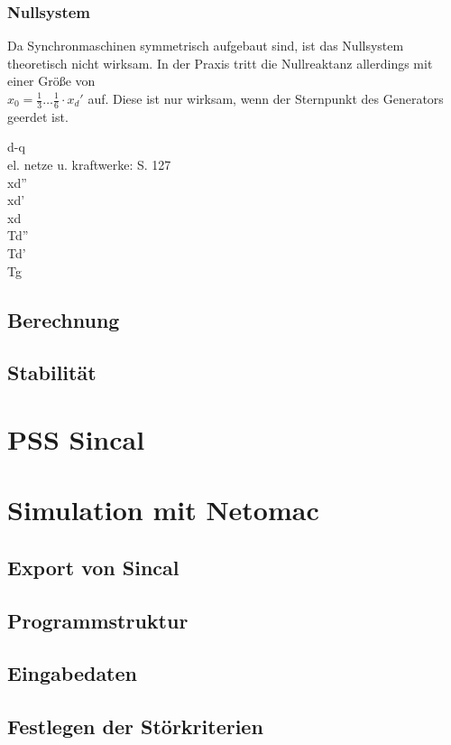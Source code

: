 \documentclass{scrartcl}
\begin{document}
\begin{onehalfspace}
\subsubsection{Nullsystem}
Da Synchronmaschinen symmetrisch aufgebaut sind, ist das Nullsystem theoretisch nicht wirksam. In der Praxis tritt die Nullreaktanz allerdings mit einer Größe von \\
$x_0 = \frac{1}{3} … \frac{1}{6} \cdot x_d'$ auf. Diese ist nur wirksam, wenn der Sternpunkt des Generators geerdet ist.


d-q \\
el. netze u. kraftwerke: S. 127 \\
xd'' \\
xd' \\
xd \\
Td'' \\
Td' \\
Tg \\

\subsection{Berechnung}

\subsection{Stabilität}

\section{PSS Sincal}

\section{Simulation mit Netomac}
\subsection{Export von Sincal}
\subsection{Programmstruktur}
\subsection{Eingabedaten}
\subsection{Festlegen der Störkriterien}

\end{onehalfspace}
\end{document}
